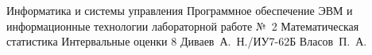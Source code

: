 \documentclass[a4paper,oneside,14pt]{extarticle}
\begin{document}
\makereporttitle
    {Информатика и системы управления} %
    {Программное обеспечение ЭВМ и информационные технологии} %
    {лабораторной работе №~2} %
    {Математическая статистика} %
    {Интервальные оценки} %
    {8} %
    {Диваев~А.~Н./ИУ7-62Б} %
    {Власов~П.~А.} %

\setcounter{page}{2}




\end{document}
